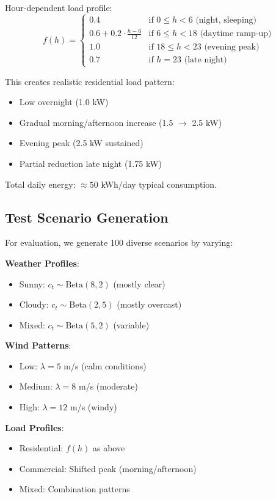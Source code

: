 \documentclass[11pt,a4paper]{article}
\begin{document}
Hour-dependent load profile:
\begin{equation}
f(h) = \begin{cases}
0.4 & \text{if } 0 \leq h < 6 \text{ (night, sleeping)} \\
0.6 + 0.2 \cdot \frac{h-6}{12} & \text{if } 6 \leq h < 18 \text{ (daytime ramp-up)} \\
1.0 & \text{if } 18 \leq h < 23 \text{ (evening peak)} \\
0.7 & \text{if } h = 23 \text{ (late night)}
\end{cases}
\end{equation}

This creates realistic residential load pattern:
\begin{itemize}
    \item Low overnight (1.0 kW)
    \item Gradual morning/afternoon increase (1.5 $\rightarrow$ 2.5 kW)
    \item Evening peak (2.5 kW sustained)
    \item Partial reduction late night (1.75 kW)
\end{itemize}

Total daily energy: $\approx 50$ kWh/day typical consumption.

\subsection{Test Scenario Generation}

For evaluation, we generate 100 diverse scenarios by varying:

\textbf{Weather Profiles}:
\begin{itemize}
    \item Sunny: $c_t \sim \text{Beta}(8, 2)$ (mostly clear)
    \item Cloudy: $c_t \sim \text{Beta}(2, 5)$ (mostly overcast)
    \item Mixed: $c_t \sim \text{Beta}(5, 2)$ (variable)
\end{itemize}

\textbf{Wind Patterns}:
\begin{itemize}
    \item Low: $\lambda = 5$ m/s (calm conditions)
    \item Medium: $\lambda = 8$ m/s (moderate)
    \item High: $\lambda = 12$ m/s (windy)
\end{itemize}

\textbf{Load Profiles}:
\begin{itemize}
    \item Residential: $f(h)$ as above
    \item Commercial: Shifted peak (morning/afternoon)
    \item Mixed: Combination patterns
\end{itemize}
\end{document}
